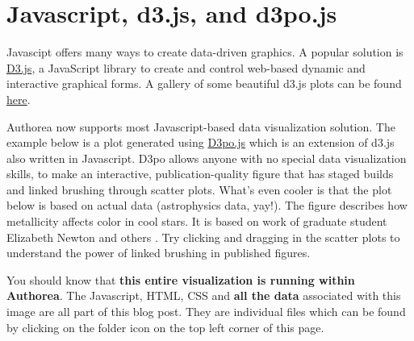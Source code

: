 \section{Javascript, d3.js, and d3po.js}

Javascipt offers many ways to create data-driven graphics. A popular solution is \href{http://d3js.org/}{D3.js}, a JavaScript library to create and control web-based dynamic and interactive graphical forms. A gallery of some beautiful d3.js plots can be found \href{https://github.com/mbostock/d3/wiki/Gallery}{here}.

Authorea now supports most Javascript-based data visualization solution. The example below is a plot generated using \href{http://d3pojs.org/}{D3po.js} which is an extension of d3.js also written in Javascript. D3po allows anyone with no special data visualization skills, to make an interactive, publication-quality figure that has staged builds and linked brushing through scatter plots. What's even cooler is that the plot below is based on actual data (astrophysics data, yay!). The figure describes how metallicity affects color in cool stars. It is based on work of graduate student Elizabeth Newton and others \cite{2014AJ....147...20N}. Try clicking and dragging in the scatter plots to understand the power of linked brushing in published figures.

You should know that \textbf{this entire visualization is running within Authorea}. The Javascript, HTML, CSS and \textbf{all the data} associated with this image are all part of this blog post. They are individual files which can be found by clicking on the folder icon on the top left corner of this page.

 